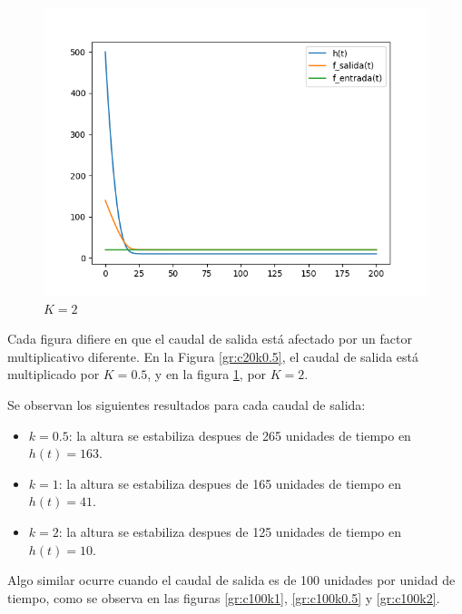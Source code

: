 \documentclass[12pt]{article}
\begin{document}
\begin{figure}[h]
\begin{minipage}{0.32\textwidth}
		\includegraphics[width=\linewidth]{c20k2}
		\caption{$K = 2$}
		\label{gr:c20k2}
	\end{minipage}
\end{figure}

Cada figura difiere en que el caudal de salida está afectado por un factor multiplicativo diferente. En la Figura \ref{gr:c20k0.5}, el caudal de salida está multiplicado por $K=0.5$, y en la figura \ref{gr:c20k2}, por $K=2$.

Se observan los siguientes resultados para cada caudal de salida:
\begin{itemize}
  \item $k=0.5$: la altura se estabiliza despues de 265 unidades de tiempo en $h(t)=163$.
  \item $k=1$: la altura se estabiliza despues de 165 unidades de tiempo en $h(t)=41$.
  \item $k=2$: la altura se estabiliza despues de 125 unidades de tiempo en $h(t)=10$.
\end{itemize}

Algo similar ocurre cuando el caudal de salida es de 100 unidades por unidad de tiempo, como se observa en las figuras \ref{gr:c100k1}, \ref{gr:c100k0.5} y \ref{gr:c100k2}.
\end{document}
